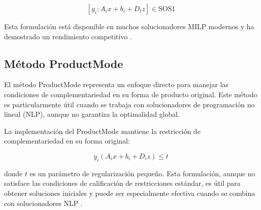 \[ [y_i ; A_ix + b_i + D_iz] \in \text{SOS1} \]

Esta formulación está disponible en muchos solucionadores MILP modernos y ha demostrado un rendimiento competitivo \cite{BilevelJump}.

\subsection{Método ProductMode}

El método ProductMode representa un enfoque directo para manejar las condiciones de complementariedad en su forma de producto original. Este método es particularmente útil cuando se trabaja con solucionadores de programación no lineal (NLP), aunque no garantiza la optimalidad global.

La implementación del ProductMode mantiene la restricción de complementariedad en su forma original:

\[ y_i(A_ix + b_i + D_iz) \leq t \]

donde $t$ es un parámetro de regularización pequeño. Esta formulación, aunque no satisface las condiciones de calificación de restricciones estándar, es útil para obtener soluciones iniciales y puede ser especialmente efectiva cuando se combina con solucionadores NLP \cite{BilevelJump}.


